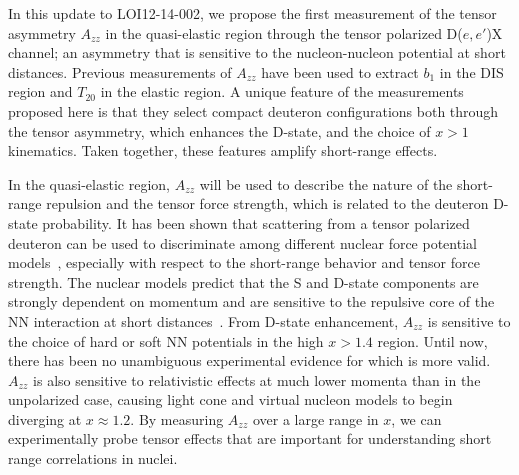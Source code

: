 

In this update to LOI12-14-002, we propose the first measurement of the tensor asymmetry $A_{zz}$ in the quasi-elastic region through the tensor polarized D($e,e'$)X channel; an asymmetry that is sensitive to the nucleon-nucleon potential 
at short distances. 
Previous measurements of $A_{zz}$ have been used to extract $b_1$ in the DIS region and $T_{20}$ in the elastic region. A unique feature of the measurements proposed here is that they select compact deuteron configurations both through the tensor asymmetry, which enhances the D-state, and the choice of $x>1$ kinematics. Taken together, these features amplify short-range effects.

In the quasi-elastic region, $A_{zz}$ will be used to describe the nature of the short-range repulsion and the tensor force strength, which is related to the deuteron D-state probability. It has been shown that scattering from a tensor polarized deuteron can be used to discriminate among different nuclear force potential models~\cite{Azzam:2005}, especially with respect to the short-range behavior and tensor force strength. The nuclear models predict that the S and D-state components are strongly dependent on momentum and are sensitive to the repulsive core of the NN interaction at short distances~\cite{Forest:1996kp}.
From D-state enhancement, $A_{zz}$ is sensitive to the choice of hard or soft NN potentials in the high $x>1.4$ region. Until now, there has been no unambiguous experimental evidence for which is more valid. $A_{zz}$ is also sensitive to relativistic effects at much lower momenta than in the unpolarized case, causing light cone and virtual nucleon models to begin diverging at $x\approx1.2$. By measuring $A_{zz}$ over a large range in $x$, we can experimentally probe tensor effects that are important for understanding short range correlations in nuclei.

